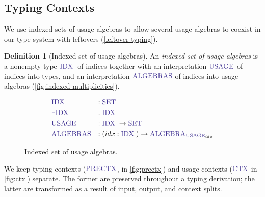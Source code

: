 \documentclass[a4paper,UKenglish,cleveref,autoref,thm-restate,authorcolumns]{lipics-v2019}
\theoremstyle{definition}
\newtheorem{nidefinition}{Definition}
\newcommand{\type}[1]{\textcolor{BlueViolet}{\operatorname{#1}}}
\newcommand{\Set}{\type{SET}}
\newcommand{\PreCtx}{\type{PRECTX}}
\newcommand{\Ctx}{\type{CTX}}
\newcommand{\Idx}{\type{IDX}\;}
\newcommand{\Usage}{\type{USAGE}}
\newcommand{\Algebra}{\type{ALGEBRA}}
\begin{document}
\subsection{Typing Contexts}
\label{contexts}

We use indexed sets of usage algebras to allow several usage algebras to coexist in our type system with leftovers (\autoref{leftover-typing}).
\begin{nidefinition}[Indexed set of usage algebras]
  An \emph{indexed set of usage algebras} is a nonempty type $\Idx$ of indices together with an interpretation $\Usage$ of indices into types, and an interpretation $\type{ALGEBRAS}$ of indices into usage algebras (\autoref{fig:indexed-multiplicities}).
  \begin{figure}[h]
    \begin{equation}
      \begin{split}
        &\Idx               &:{} &\Set \\
        &\type{\exists IDX} &:{} &\Idx \\
        &\Usage             &:{} &\Idx \to \Set \\
        &\type{ALGEBRAS}    &:{} &(idx : \Idx) \to \Algebra_{\Usage_{idx}}
      \end{split}
    \end{equation}
    \caption{Indexed set of usage algebras.}
    \label{fig:indexed-multiplicities}
  \end{figure}
\end{nidefinition}

We keep typing contexts ($\PreCtx$, in \autoref{fig:prectx}) and usage contexts ($\Ctx$ in \autoref{fig:ctx}) separate.
The former are preserved throughout a typing derivation; the latter are transformed as a result of input, output, and context splits.
\end{document}
